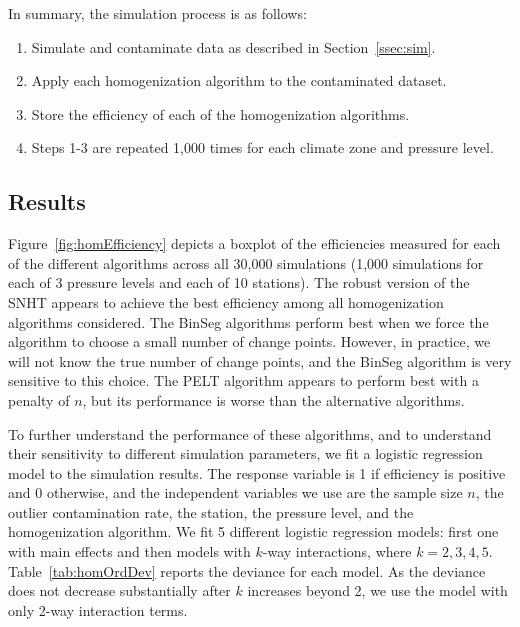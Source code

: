 \documentclass[12pt]{article}
\begin{document}
\begin{doublespacing}
In summary, the simulation process is as follows:

\begin{enumerate}
	\item Simulate and contaminate data as described in Section~\ref{ssec:sim}.
	\item Apply each homogenization algorithm to the contaminated dataset.
	\item Store the efficiency of each of the homogenization algorithms.
	\item Steps 1-3 are repeated 1,000 times for each climate zone and pressure level.
\end{enumerate}

\subsection{Results}

\label{sec:HomResults}


Figure~\ref{fig:homEfficiency} depicts a boxplot of the efficiencies measured for each of the different algorithms across all 30,000 simulations (1,000 simulations for each of 3 pressure levels and each of 10 stations).  The robust version of the SNHT appears to achieve the best efficiency among all homogenization algorithms considered.  The BinSeg algorithms perform best when we force the algorithm to choose a small number of change points.  However, in practice, we will not know the true number of change points, and the BinSeg algorithm is very sensitive to this choice.  The PELT algorithm appears to perform best with a penalty of $n$, but its performance is  worse than the alternative algorithms.

To further understand the performance of these algorithms, and to understand their sensitivity to different simulation parameters, we fit a logistic regression model to the simulation results.  The response variable is 1 if efficiency is positive and 0 otherwise, and the independent variables we use are the sample size $n$, the outlier contamination rate, the station, the pressure level, and the homogenization algorithm.  We fit 5 different logistic regression models: first one with main effects and then models with $k$-way interactions, where $k=2,3,4,5$.  Table~\ref{tab:homOrdDev} reports the deviance for each model.  As the deviance does not decrease substantially after $k$ increases beyond 2, we use the model with only 2-way interaction terms.


\end{doublespacing}
\end{document}
